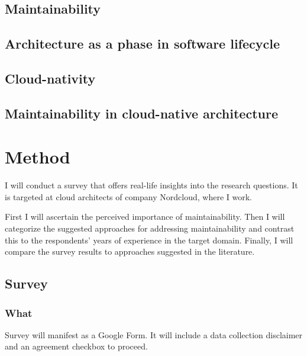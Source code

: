 \documentclass[utf8,english]{gradu3}
\begin{document}
\section{Maintainability}

\section{Architecture as a phase in software lifecycle}

\section{Cloud-nativity}

\section{Maintainability in cloud-native architecture}

\chapter{Method}

I will conduct a survey that offers real-life insights into the research questions.
It is targeted at cloud architects of company Nordcloud, where I work.

First I will ascertain the perceived importance of maintainability.
Then I will categorize the suggested approaches for addressing maintainability
and contrast this to the respondents' years of experience in the target domain.
Finally, I will compare the survey results to approaches suggested in the literature.


\section{Survey}

\subsection{What}
Survey will manifest as a Google Form.
It will include a data collection disclaimer and an agreement checkbox to proceed.
\end{document}
